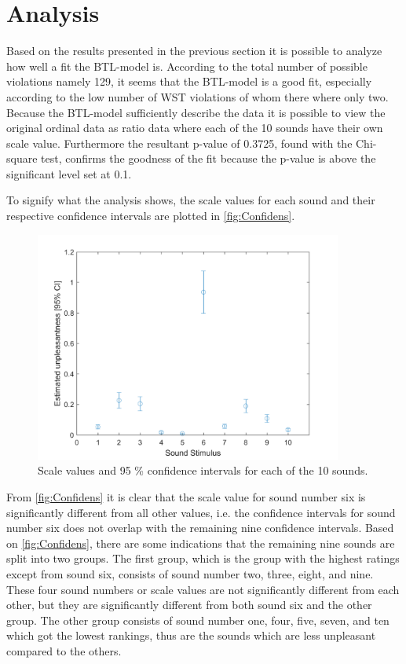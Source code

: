 \section*{Analysis}
\label{Analyse}
%
Based on the results presented in the previous section it is possible to analyze how well a fit the BTL-model is.\blankline
%
According to the total number of possible violations namely 129, it seems that the BTL-model is a good fit, especially according to the low number of WST violations of whom there where only two. Because the BTL-model sufficiently describe the data it is possible to view the original ordinal data as ratio data where each of the 10 sounds have their own scale value. Furthermore the resultant p-value of 0.3725, found with the Chi-square test, confirms the goodness of the fit because the p-value is above the significant level set at 0.1.

To signify what the analysis shows, the scale values for each sound and their respective confidence intervals are plotted in \autoref{fig:Confidens}. 
%
\begin{figure}[H]
\centering
\includegraphics[width = 0.90\textwidth]{Figure/Confidens.png} 
\caption{Scale values and 95 \% confidence intervals for each of the 10 sounds.}
\label{fig:Confidens}
\end{figure}
\noindent 
%
From \autoref{fig:Confidens} it is clear that the scale value for sound number six is significantly different from all other values, i.e. the confidence intervals for sound number six does not overlap with the remaining nine confidence intervals. Based on \autoref{fig:Confidens}, there are some indications that the remaining nine sounds are split into two groups. The first group, which is the group with the highest ratings except from sound six, consists of sound number two, three, eight, and nine. These four sound numbers or scale values are not significantly different from each other, but they are significantly different from both sound six and the other group. The other group consists of sound number one, four, five, seven, and ten which got the lowest rankings, thus are the sounds which are less unpleasant compared to the others.   



